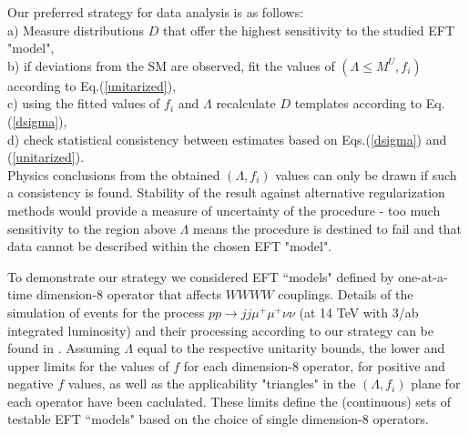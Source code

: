 Our preferred strategy for data analysis is as follows:\\
a)  Measure  distributions $D$ that
offer the highest sensitivity to the studied EFT "model",\\
b) if deviations from the SM are observed, fit the values of 
$(\Lambda\leq M^U, f_i)$  according to 
Eq.(\ref{unitarized}),\\
c) using the fitted values of $f_i$ and $\Lambda$ recalculate 
$D$  templates 
according to 
Eq.(\ref{dsigma}),\\
d) check statistical consistency between estimates based on Eqs.(\ref{dsigma}) and (\ref{unitarized}). \\
 Physics conclusions from the obtained $(\Lambda, f_i)$ values can only be drawn
if such a consistency is found.  
%
%
Stability of the result against alternative 
regularization methods  would provide a measure of uncertainty of the procedure - too much
sensitivity to the region above $\Lambda$ means the procedure is destined to fail
and  that data cannot be described within the chosen EFT "model".

%

To demonstrate our strategy we considered EFT ``models" defined by 
one-at-a-time dimension-8 operator that affects $WWWW$ couplings. Details of the simulation of events for  the process 
$pp \to jj\mu^+\mu^+\nu\nu$ (at 14 TeV with 3/ab integrated luminosity) and their processing according to our strategy can be found in \cite{Kalinowski:2018oxd}. 
Assuming $\Lambda$ equal to the respective unitarity bounds,
the lower and upper limits for the values of $f$ for each dimension-8 operator, for positive
and negative $f$ values, as well as the applicability "triangles" in the $(\Lambda,f_i)$ plane for each operator have been caclulated.
  These limits define the (continuous) sets of testable 
EFT ``models" based on the choice of single dimension-8 operators. 


